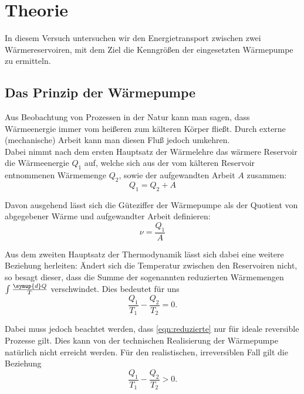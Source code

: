 \section{Theorie}
\label{sec:Theorie}

In diesem Versuch untersuchen wir den Energietransport zwischen 
zwei Wärmereservoiren, mit dem Ziel die Kenngrößen der 
eingesetzten Wärmepumpe zu ermitteln.

\subsection{Das Prinzip der Wärmepumpe}
Aus Beobachtung von Prozessen in der Natur kann man sagen, dass Wärmeenergie immer vom heißeren zum kälteren
Körper fließt. Durch externe (mechanische) Arbeit kann man diesen Fluß jedoch umkehren. \\
Dabei nimmt nach 
dem ersten Hauptsatz der Wärmelehre das wärmere Reservoir die Wärmeenergie $Q_1$ auf, welche sich aus der
vom kälteren Reservoir entnommenen Wärmemenge $Q_2$, sowie der aufgewandten Arbeit $A$ zusammen:
\begin{equation}
	Q_1 = Q_2 + A
	\label{eqn:waermemenge}
\end{equation}

Davon ausgehend lässt sich die Güteziffer der Wärmepumpe als der Quotient von abgegebener Wärme
und aufgewandter Arbeit definieren:
\begin{equation}
	\nu = \frac{Q_1}{A}
	\label{eqn:gueteziffer}
\end{equation}

Aus dem zweiten Hauptsatz der Thermodynamik lässt sich dabei eine weitere Beziehung herleiten:
Ändert sich die Temperatur zwischen den Reservoiren nicht, so besagt dieser, dass
die Summe der sogenannten 
reduzierten Wärmemengen $\int \frac{\symup{d}Q}{T}$ verschwindet. Dies bedeutet für uns
\begin{equation}
	\frac{Q_1}{T_1} - \frac{Q_2}{T_2} = 0.
	\label{eqn:reduzierte}
\end{equation}

Dabei muss jedoch beachtet werden, dass \eqref{eqn:reduzierte} nur für ideale reversible 
Prozesse gilt. Dies kann von der technischen Realisierung der Wärmepumpe natürlich nicht erreicht werden.
Für den realistischen, irreversiblen Fall gilt die Beziehung
\begin{equation}
	\frac{Q_1}{T_1} - \frac{Q_2}{T_2} > 0.
	\label{eqn:reduzreal}
\end{equation}

